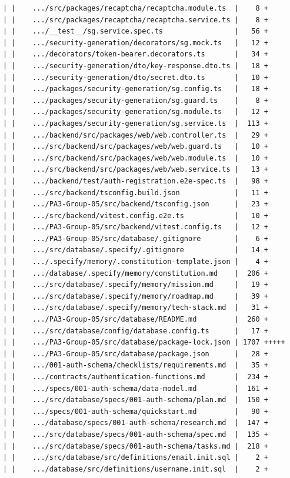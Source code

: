 \documentclass[12pt]{article}
\begin{document}
\begin{lstlisting}[numbers=none,breaklines=true]
| |    .../src/packages/recaptcha/recaptcha.module.ts  |    8 +
| |    .../src/packages/recaptcha/recaptcha.service.ts |    8 +
| |    .../__test__/sg.service.spec.ts                 |   56 +
| |    .../security-generation/decorators/sg.mock.ts   |   12 +
| |    .../decorators/token-bearer.decorators.ts       |   34 +
| |    .../security-generation/dto/key-response.dto.ts |   18 +
| |    .../security-generation/dto/secret.dto.ts       |   10 +
| |    .../packages/security-generation/sg.config.ts   |   18 +
| |    .../packages/security-generation/sg.guard.ts    |    8 +
| |    .../packages/security-generation/sg.module.ts   |   12 +
| |    .../packages/security-generation/sg.service.ts  |  113 +
| |    .../backend/src/packages/web/web.controller.ts  |   29 +
| |    .../src/backend/src/packages/web/web.guard.ts   |   10 +
| |    .../src/backend/src/packages/web/web.module.ts  |   10 +
| |    .../src/backend/src/packages/web/web.service.ts |   13 +
| |    .../backend/test/auth-registration.e2e-spec.ts  |   98 +
| |    .../src/backend/tsconfig.build.json             |   11 +
| |    .../PA3-Group-05/src/backend/tsconfig.json      |   23 +
| |    .../src/backend/vitest.config.e2e.ts            |   10 +
| |    .../PA3-Group-05/src/backend/vitest.config.ts   |   12 +
| |    .../PA3-Group-05/src/database/.gitignore        |    6 +
| |    .../src/database/.specify/.gitignore            |   14 +
| |    .../.specify/memory/.constitution-template.json |    4 +
| |    .../database/.specify/memory/constitution.md    |  206 +
| |    .../src/database/.specify/memory/mission.md     |   19 +
| |    .../src/database/.specify/memory/roadmap.md     |   39 +
| |    .../src/database/.specify/memory/tech-stack.md  |   31 +
| |    .../PA3-Group-05/src/database/README.md         |  260 +
| |    .../src/database/config/database.config.ts      |   17 +
| |    .../PA3-Group-05/src/database/package-lock.json | 1707 +++++
| |    .../PA3-Group-05/src/database/package.json      |   28 +
| |    .../001-auth-schema/checklists/requirements.md  |   35 +
| |    .../contracts/authentication-functions.md       |  234 +
| |    .../specs/001-auth-schema/data-model.md         |  161 +
| |    .../src/database/specs/001-auth-schema/plan.md  |  150 +
| |    .../specs/001-auth-schema/quickstart.md         |   90 +
| |    .../database/specs/001-auth-schema/research.md  |  147 +
| |    .../src/database/specs/001-auth-schema/spec.md  |  135 +
| |    .../src/database/specs/001-auth-schema/tasks.md |  218 +
| |    .../src/database/src/definitions/email.init.sql |    2 +
| |    .../database/src/definitions/username.init.sql  |    2 +

\end{lstlisting}
\end{document}
